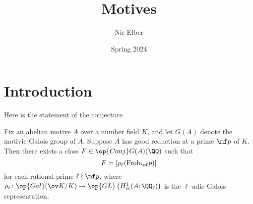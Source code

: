 \documentclass{article}
\title{Motives}
\author{Nir Elber}
\date{Spring 2024}
\begin{document}
\maketitle

\tableofcontents

\section{Introduction}
Here is the statement of the conjecture.
\begin{conj} \label{conj:desired-conjecture}
	Fix an abelian motive $A$ over a number field $K$, and let $G(A)$ denote the motivic Galois group of $A$. Suppose $A$ has good reduction at a prime $\mf p$ of $K$. Then there exists a class $F\in\op{Conj}G(A)(\QQ)$ such that
	\[F=[\rho_\ell(\mathrm{Frob}_\mf p)]\]
	for each rational prime $\ell\nmid\mf p$, where $\rho_\ell\colon\op{Gal}(\ov K/K)\to\op{GL}\left(H^1_{\mathrm{\acute et}}(A;\QQ_\ell)\right)$ is the $\ell$-adic Galois representation.
\end{conj}

\end{document}
